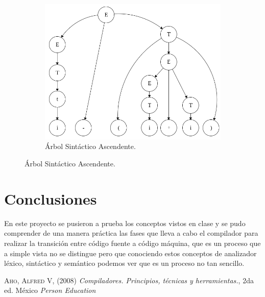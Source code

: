 \documentclass[letterpaper]{article}
\begin{document}
\begin{figure}[H]
    \centering
    \begin{subfigure}{0.45\textwidth}
        \includegraphics[width=\textwidth]{img/arbol_sint}
        \caption*{Árbol Sintáctico Ascendente.}
    \end{subfigure}
\end{figure}

\section{Conclusiones}
En este proyecto se pusieron a prueba los conceptos vistos en clase y se pudo
comprender de una manera práctica las fases que lleva a cabo el compilador para 
realizar la transición entre código fuente a código máquina, que es un proceso
que a simple vista no se distingue pero que conociendo estos conceptos de analizador
léxico, sintáctico y semántico podemos ver que es un proceso no tan sencillo.

\begin{thebibliography}{3}
     \textsc{Aho, Alfred V}, (2008) \textit{Compiladores. Principios,
    técnicas y herramientas.}, 2da ed. México \textit{Person Education}  
\end{thebibliography}
\end{document}
